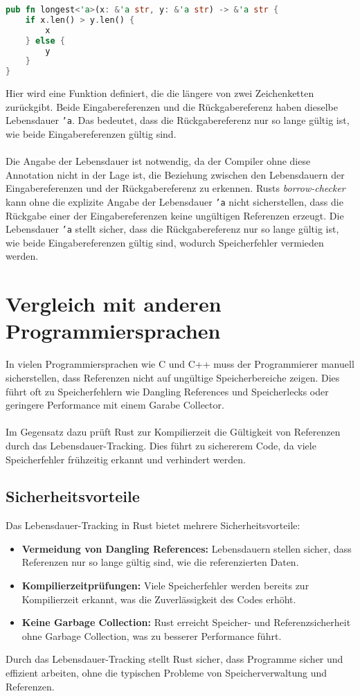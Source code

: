 \begin{lstlisting}[language=Rust, caption={Längere von zwei Zeichenketten ermitteln}]
pub fn longest<'a>(x: &'a str, y: &'a str) -> &'a str {
    if x.len() > y.len() {
        x
    } else {
        y
    }
}
\end{lstlisting}
\noindent
Hier wird eine Funktion definiert, die die längere von zwei Zeichenketten zurückgibt. 
Beide Eingabereferenzen und die Rückgabereferenz haben dieselbe Lebensdauer \texttt{'a}. 
Das bedeutet, dass die Rückgabereferenz nur so lange gültig ist, wie beide Eingabereferenzen gültig sind.\\
\\
Die Angabe der Lebensdauer ist notwendig, da der Compiler ohne diese Annotation nicht in der Lage ist, die Beziehung zwischen den Lebensdauern der Eingabereferenzen und der Rückgabereferenz zu erkennen. 
Rusts \textit{\gls{borrow-checker}} kann ohne die explizite Angabe der Lebensdauer \texttt{'a} nicht sicherstellen, dass die Rückgabe einer der Eingabereferenzen keine ungültigen Referenzen erzeugt. 
Die Lebensdauer \texttt{'a} stellt sicher, dass die Rückgabereferenz nur so lange gültig ist, wie beide Eingabereferenzen gültig sind, wodurch Speicherfehler vermieden werden.

\section{Vergleich mit anderen Programmiersprachen}
In vielen Programmiersprachen wie C und C++ muss der Programmierer manuell sicherstellen, dass Referenzen nicht auf ungültige Speicherbereiche zeigen. 
Dies führt oft zu Speicherfehlern wie Dangling References und Speicherlecks oder geringere Performance mit einem Garabe Collector.\\
\\
Im Gegensatz dazu prüft Rust zur Kompilierzeit die Gültigkeit von Referenzen durch das Lebensdauer-Tracking. 
Dies führt zu sichererem Code, da viele Speicherfehler frühzeitig erkannt und verhindert werden.

\subsection{Sicherheitsvorteile}
Das Lebensdauer-Tracking in Rust bietet mehrere Sicherheitsvorteile:

\begin{itemize}
    \item \textbf{Vermeidung von Dangling References:} Lebensdauern stellen sicher, dass Referenzen nur so lange gültig sind, wie die referenzierten Daten.
    \item \textbf{Kompilierzeitprüfungen:} Viele Speicherfehler werden bereits zur Kompilierzeit erkannt, was die Zuverlässigkeit des Codes erhöht.
    \item \textbf{Keine Garbage Collection:} Rust erreicht Speicher- und Referenzsicherheit ohne Garbage Collection, was zu besserer Performance führt.
\end{itemize}
\noindent
Durch das Lebensdauer-Tracking stellt Rust sicher, dass Programme sicher und effizient arbeiten, ohne die typischen Probleme von Speicherverwaltung und Referenzen.

